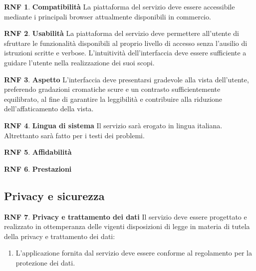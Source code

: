 \documentclass[11pt, a4paper]{article}
\theoremstyle{definition}
\newtheorem{nonfuncreq}{RNF} %
\begin{document}
\begin{nonfuncreq}
\label{compatibility}
\textbf{Compatibilità }
La piattaforma del servizio deve essere accessibile mediante i principali
browser attualmente disponibili in commercio.
\end{nonfuncreq}


\begin{nonfuncreq}
\textbf{Usabilità }
La piattaforma del servizio deve permettere all'utente di sfruttare le
funzionalità disponibili al proprio livello di accesso senza l'ausilio di
istruzioni scritte e verbose. L'intuitività dell'interfaccia deve essere
sufficiente a guidare l'utente nella realizzazione dei suoi scopi.
\end{nonfuncreq}

\begin{nonfuncreq}
\textbf{Aspetto }
L'interfaccia deve presentarsi gradevole alla vista dell'utente, preferendo
gradazioni cromatiche scure e un contrasto sufficientemente equilibrato,
al fine di garantire la leggibilità e contribuire alla riduzione
dell'affaticamento della vista.
\end{nonfuncreq}

\begin{nonfuncreq}
\textbf{Lingua di sistema }
Il servizio sarà erogato in lingua italiana. Altrettanto sarà fatto per i
testi dei problemi.
\end{nonfuncreq}

\begin{nonfuncreq}
\textbf{Affidabilità }

\end{nonfuncreq}

\begin{nonfuncreq}
\textbf{Prestazioni }

\end{nonfuncreq}

\subsection{Privacy e sicurezza}

\begin{nonfuncreq}
\textbf{Privacy e trattamento dei dati }
Il servizio deve essere progettato e realizzato in ottemperanza delle
vigenti disposizioni di legge in materia di tutela della privacy e
trattamento dei dati:
\begin{enumerate}
    \item L'applicazione fornita dal servizio deve essere conforme
    al regolamento \href{https://www.garanteprivacy.it/documents/10160/0/Regolamento+UE+2016+679.+Arricchito+con+riferimenti+ai+Considerando+Aggiornato+alle+rettifiche+pubblicate+sulla+Gazzetta+Ufficiale++dell%27Unione+europea+127+del+23+maggio+2018}{\textcolor{blue}{\underbar{UE n.2016/679}}} per la protezione dei dati.
\end{enumerate}
\end{nonfuncreq}
\end{document}
